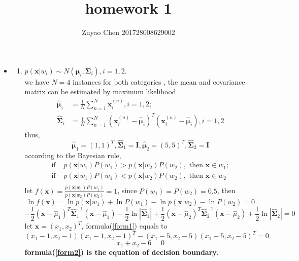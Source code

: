 \documentclass[12pt,a4paper]{article}
\title{homework 1}
\author{Zuyao Chen 201728008629002}
\date{}
\begin{document}
\maketitle

\begin{itemize}
	\item \begin{enumerate}[(1)]
		\item  
		$p(\bm{x}|w_i)\sim N(\bm{\mu}_i,\bm{\Sigma}_i),i=1,2.$ \\ 
		we have $N = 4$ instances for both categories ,
		the mean and covariance matrix can be estimated by maximum likelihood 
		\[ \begin{split} 
		\hat{\bm{\mu}}_i &= \frac{1}{N}\sum_{n=1}^{N}\bm{x}_{i}^{(n)},i=1,2; \\
		\hat{\bm{\Sigma}}_i &= \frac{1}{N} \sum_{n=1}^{N}
						 (\bm{x}_i^{(n)} - \hat{\bm{\mu}}_i)^{T}  (\bm{x}_i^{(n)} - \hat{\bm{\mu}}_i),i=1,2
		  \end{split} 						 
		\]
		thus, 
		\[
			\hat{\bm{\mu}}_1 = (1,1)^T,
			\hat{\bm{\Sigma}}_1 =  \bm{I},
			\hat{\bm{\mu}}_2 = (5,5)^T,  
			\hat{\bm{\Sigma}}_2 = \bm{I}
		\]	
		according to the Bayesian rule,
		\[ \begin{split} 
			\text{if } &p(\bm{x}|w_1)P(w_1) > p(\bm{x}|w_2)P(w_2),\text{ then } \bm{x}\in w_1; \\
			\text{if } &p(\bm{x}|w_1)P(w_1) < p(\bm{x}|w_2)P(w_2),\text{ then } \bm{x}\in w_2 \\	
			\end{split}
		\]	
		let $f(\bm{x}) = \frac{p(\bm{x}|w_1)P(w_1)}{p(\bm{x}|w_2)P(w_2)} = 1$,
		since $P(w_1) = P(w_2) = 0.5$,
		then 
		\[
			\ln f(\bm{x}) = \ln p(\bm{x}|w_1) + \ln P(w_1) -
			  \ln p(\bm{x}|w_2) - \ln P(w_2) = 0
		\]
 		\begin{equation}
 		\label{form1}	
 			-\frac{1}{2}(\bm{x}-\hat{\mu}_1)^{T}\bm{\hat\Sigma}_1^{-1}
 		   (\bm{x}-\hat{\mu}_1) -\frac{1}{2}\ln \left|\bm{\hat\Sigma}_1\right| + \frac{1}{2}(\bm{x}-\hat{\mu}_2)^{T}\bm{\hat\Sigma}_2^{-1}
 		   (\bm{x}-\hat{\mu}_2) 
		   + \frac{1}{2}\ln \left|\bm{\hat\Sigma}_2\right|	   
 		   = 0
 		\end{equation}		
		let $\bm{x} = (x_1,x_2)^T$, formula(\ref{form1}) equals to 
		\[
		  (x_1 - 1,x_2-1)(x_1-1,x_2-1)^T - (x_1 - 5,x_2-5)(x_1-5,x_2-5)^T = 0
		\]
		\begin{equation}
			\label{form2}
			x_1 + x_2 -6 = 0
		\end{equation}
		\textbf{formula(\ref{form2}) is the equation of decision boundary}.

\end{enumerate}
\end{itemize}
\end{document}
